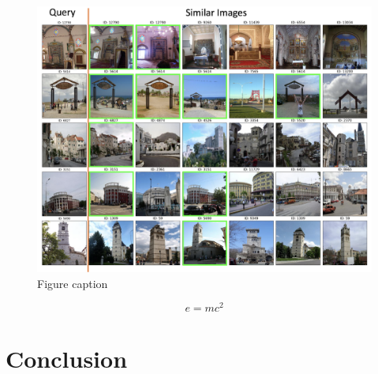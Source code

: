 \documentclass[final,3p]{elsarticle}
\begin{document}
\begin{figure}[hbtp]
\centering\includegraphics[width=1.0\linewidth]{./figures/result.png}
\caption{Figure caption}
\label{fig:problem}
\end{figure}

\begin{equation}
\label{eq:emc}
e = mc^2
\end{equation}



\section{Conclusion}
\label{S:5}














\end{document}
